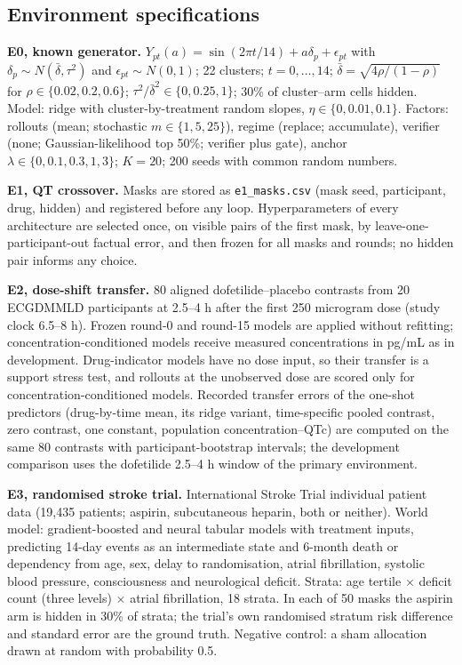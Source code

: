 \documentclass[11pt,a4paper]{article}
\begin{document}
\subsection{Environment specifications}
\textbf{E0, known generator.} $Y_{pt}(a)=\sin(2\pi t/14)+a\delta_p+\epsilon_{pt}$ with $\delta_p\sim N(\bar\delta,\tau^2)$ and $\epsilon_{pt}\sim N(0,1)$; 22 clusters; $t=0,\ldots,14$; $\bar\delta=\sqrt{4\rho/(1-\rho)}$ for $\rho\in\{0.02,0.2,0.6\}$; $\tau^2/\bar\delta^2\in\{0,0.25,1\}$; 30\% of cluster--arm cells hidden. Model: ridge with cluster-by-treatment random slopes, $\eta\in\{0,0.01,0.1\}$. Factors: rollouts (mean; stochastic $m\in\{1,5,25\}$), regime (replace; accumulate), verifier (none; Gaussian-likelihood top 50\%; verifier plus gate), anchor $\lambda\in\{0,0.1,0.3,1,3\}$; $K=20$; 200 seeds with common random numbers.

\textbf{E1, QT crossover.} Masks are stored as \texttt{e1\_masks.csv} (mask seed, participant, drug, hidden) and registered before any loop. Hyperparameters of every architecture are selected once, on visible pairs of the first mask, by leave-one-participant-out factual error, and then frozen for all masks and rounds; no hidden pair informs any choice.

\textbf{E2, dose-shift transfer.} 80 aligned dofetilide--placebo contrasts from 20 ECGDMMLD participants at 2.5--4 h after the first 250 microgram dose (study clock 6.5--8 h). Frozen round-0 and round-15 models are applied without refitting; concentration-conditioned models receive measured concentrations in pg/mL as in development. Drug-indicator models have no dose input, so their transfer is a support stress test, and rollouts at the unobserved dose are scored only for concentration-conditioned models\cite{johannesen2016latena}. Recorded transfer errors of the one-shot predictors (drug-by-time mean, its ridge variant, time-specific pooled contrast, zero contrast, one constant, population concentration--QTc) are computed on the same 80 contrasts with participant-bootstrap intervals; the development comparison uses the dofetilide 2.5--4 h window of the primary environment.

\textbf{E3, randomised stroke trial.} International Stroke Trial individual patient data (19,435 patients; aspirin, subcutaneous heparin, both or neither)\cite{ist2011}. World model: gradient-boosted and neural tabular models with treatment inputs, predicting 14-day events as an intermediate state and 6-month death or dependency from age, sex, delay to randomisation, atrial fibrillation, systolic blood pressure, consciousness and neurological deficit. Strata: age tertile $\times$ deficit count (three levels) $\times$ atrial fibrillation, 18 strata. In each of 50 masks the aspirin arm is hidden in 30\% of strata; the trial's own randomised stratum risk difference and standard error are the ground truth. Negative control: a sham allocation drawn at random with probability 0.5.
\end{document}
